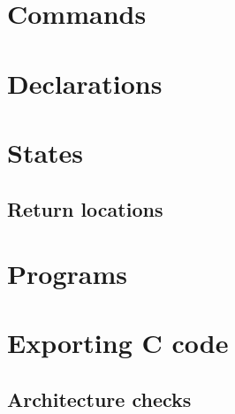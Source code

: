 \section{Commands}
\section{Declarations}
\section{States}
\subsection{Return locations}
\section{Programs}
\section{Exporting C code}
\subsection{Architecture checks}